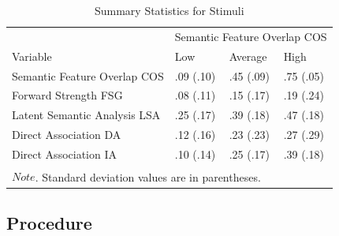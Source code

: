 \documentclass[english,,man]{apa6}
\begin{document}
\begin{table}[t]

\caption{\label{tab:stim-table}Summary Statistics for Stimuli}
\centering
\begin{tabular}{llll}
\toprule
\multicolumn{1}{c}{ } & \multicolumn{3}{c}{Semantic Feature Overlap COS} \\
\cmidrule(l{3pt}r{3pt}){2-4}
Variable & Low & Average & High\\
\midrule
Semantic Feature Overlap COS & .09 (.10) & .45 (.09) & .75 (.05)\\
Forward Strength FSG & .08 (.11) & .15 (.17) & .19 (.24)\\
Latent Semantic Analysis LSA & .25 (.17) & .39 (.18) & .47 (.18)\\
Direct Association DA & .12 (.16) & .23 (.23) & .27 (.29)\\
Direct Association IA & .10 (.14) & .25 (.17) & .39 (.18)\\
\bottomrule
\multicolumn{4}{l}{\textsuperscript{} $Note$. Standard deviation values are in parentheses.}\\
\end{tabular}
\end{table}

\hypertarget{procedure}{%
\subsection{Procedure}\label{procedure}}
\end{document}
